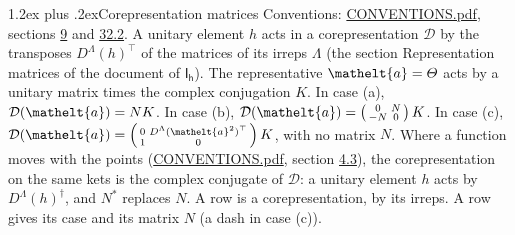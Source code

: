 \documentclass[10pt,a4paper]{article}
\makeatletter
\renewcommand\section{\@startsection{section}{1}{\z@}{-3ex plus -1ex minus -.2ex}%
  {1.2ex plus .2ex}{\normalfont\large\sffamily\bfseries\color{parttitle}}}
\numberwithin{equation}{section}
\newcommand{\eltfont}[1]{{\let\sigma\eltsigma\mathelt{#1}}}
\newcommand{\grp}[1]{\mathsf{#1}}
\newcommand{\elt}[1]{\eltfont{#1}}
\makeatother
\begin{document}
\section{Corepresentation matrices}\label{s:corep_matrices}
Conventions: \href{../../CONVENTIONS.pdf}{CONVENTIONS.pdf}, sections \href{../../../rotation/CONVENTIONS.pdf\#conv.9}{9} and \href{../../CONVENTIONS.pdf\#conv.32.2}{32.2}.
A unitary element $h$ acts in a corepresentation $\mathcal{D}$ by the transposes $D^{\Lambda}(h)^{\top}$ of the matrices of its irreps $\Lambda$ (the section Representation matrices of the document of \href{../../../rotation/data/pdf/Ih.pdf}{$\grp{I_{h}}$}). The representative $\elt{a} = \varTheta$ acts by a unitary matrix times the complex conjugation $K$.
In case (a), $\mathcal{D}(\elt{a}) = NK$. In case (b), $\mathcal{D}(\elt{a}) = \left(\begin{smallmatrix} 0 & N \\ -N & 0 \end{smallmatrix}\right) K$. In case (c), $\mathcal{D}(\elt{a}) = \left(\begin{smallmatrix} 0 & D^{\Lambda}(\elt{a}^2)^{\top} \\ 1 & 0 \end{smallmatrix}\right) K$, with no matrix $N$.
Where a function moves with the points (\href{../../CONVENTIONS.pdf}{CONVENTIONS.pdf}, section \href{../../../rotation/CONVENTIONS.pdf\#conv.4.3}{4.3}), the corepresentation on the same kets is the complex conjugate of $\mathcal{D}$: a unitary element $h$ acts by $D^{\Lambda}(h)^{\dagger}$, and $N^{*}$ replaces $N$.
A row is a corepresentation, by its irreps. A row gives its case and its matrix $N$ (a dash in case (c)).
\end{document}
